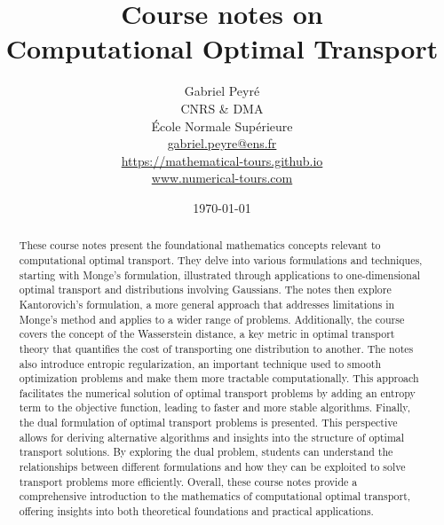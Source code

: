 \documentclass[10pt]{article}
\title{Course notes on\\ Computational Optimal Transport}
\author{%
\begin{tabular}{c}
	Gabriel Peyr{\'e} \\ CNRS \& DMA \\
	 \'Ecole Normale Sup\'erieure \\
	 \url{gabriel.peyre@ens.fr}\\
	 \url{https://mathematical-tours.github.io}\\
	 \url{www.numerical-tours.com}
\end{tabular}
}
\date{\today}
\begin{document}
\maketitle

\begin{abstract}
These course notes present the foundational mathematics concepts relevant to computational optimal transport. They delve into various formulations and techniques, starting with Monge's formulation, illustrated through applications to one-dimensional optimal transport and distributions involving Gaussians. The notes then explore Kantorovich's formulation, a more general approach that addresses limitations in Monge's method and applies to a wider range of problems.
%
Additionally, the course covers the concept of the Wasserstein distance, a key metric in optimal transport theory that quantifies the cost of transporting one distribution to another.
%
The notes also introduce entropic regularization, an important technique used to smooth optimization problems and make them more tractable computationally. This approach facilitates the numerical solution of optimal transport problems by adding an entropy term to the objective function, leading to faster and more stable algorithms.
%
Finally, the dual formulation of optimal transport problems is presented. This perspective allows for deriving alternative algorithms and insights into the structure of optimal transport solutions. By exploring the dual problem, students can understand the relationships between different formulations and how they can be exploited to solve transport problems more efficiently.
%
Overall, these course notes provide a comprehensive introduction to the mathematics of computational optimal transport, offering insights into both theoretical foundations and practical applications.
\end{abstract}










%
%

%






\end{document}

